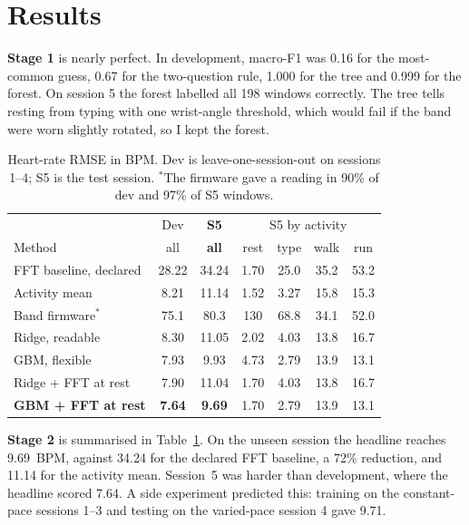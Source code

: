 \documentclass[conference]{IEEEtran}
\newcommand{\tsmall}{\footnotesize\setlength{\tabcolsep}{3.5pt}}
\begin{document}
\section{Results}
\textbf{Stage 1} is nearly perfect. In development, macro-F1 was 0.16 for the most-common guess, 0.67 for the two-question rule, 1.000 for the tree and 0.999 for the forest. On session 5 the forest labelled all 198 windows correctly. The tree tells resting from typing with one wrist-angle threshold, which would fail if the band were worn slightly rotated, so I kept the forest.

\begin{table}[t]
\centering\tsmall
\caption{Heart-rate RMSE in BPM. Dev is leave-one-session-out on sessions 1--4; S5 is the test session. $^*$The firmware gave a reading in 90\% of dev and 97\% of S5 windows.}
\label{tab:main}
\setlength{\tabcolsep}{2.6pt}
\begin{tabular}{@{}lcc|cccc@{}}
\toprule
 & Dev & \textbf{S5} & \multicolumn{4}{c}{S5 by activity} \\
Method & all & \textbf{all} & rest & type & walk & run \\
\midrule
FFT baseline, declared & 28.22 & 34.24 & 1.70 & 25.0 & 35.2 & 53.2 \\
Activity mean & 8.21 & 11.14 & 1.52 & 3.27 & 15.8 & 15.3 \\
Band firmware$^*$ & 75.1 & 80.3 & 130 & 68.8 & 34.1 & 52.0 \\
\midrule
Ridge, readable & 8.30 & 11.05 & 2.02 & 4.03 & 13.8 & 16.7 \\
GBM, flexible & 7.93 & 9.93 & 4.73 & 2.79 & 13.9 & 13.1 \\
Ridge + FFT at rest & 7.90 & 11.04 & 1.70 & 4.03 & 13.8 & 16.7 \\
\textbf{GBM + FFT at rest} & \textbf{7.64} & \textbf{9.69} & 1.70 & 2.79 & 13.9 & 13.1 \\
\bottomrule
\end{tabular}
\end{table}

\textbf{Stage 2} is summarised in Table~\ref{tab:main}. On the unseen session the headline reaches 9.69~BPM, against 34.24 for the declared FFT baseline, a 72\% reduction, and 11.14 for the activity mean. Session~5 was harder than development, where the headline scored 7.64. A side experiment predicted this: training on the constant-pace sessions 1--3 and testing on the varied-pace session 4 gave 9.71.
\end{document}
